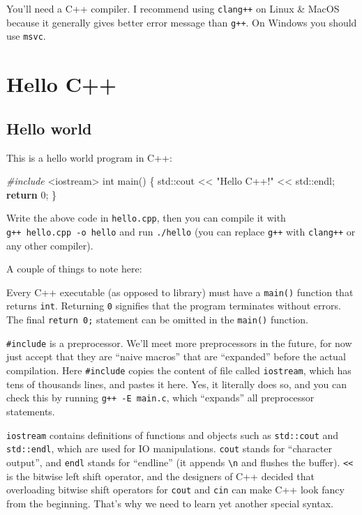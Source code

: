 \documentclass[
]{book}
\newenvironment{Shaded}{\begin{snugshade}}{\end{snugshade}}
\newcommand{\BuiltInTok}[1]{#1}
\newcommand{\ControlFlowTok}[1]{\textcolor[rgb]{0.13,0.29,0.53}{\textbf{#1}}}
\newcommand{\DataTypeTok}[1]{\textcolor[rgb]{0.13,0.29,0.53}{#1}}
\newcommand{\DecValTok}[1]{\textcolor[rgb]{0.00,0.00,0.81}{#1}}
\newcommand{\ImportTok}[1]{#1}
\newcommand{\NormalTok}[1]{#1}
\newcommand{\PreprocessorTok}[1]{\textcolor[rgb]{0.56,0.35,0.01}{\textit{#1}}}
\newcommand{\StringTok}[1]{\textcolor[rgb]{0.31,0.60,0.02}{#1}}
\begin{document}
You'll need a C++ compiler. I recommend using \texttt{clang++} on Linux \& MacOS because it generally gives better error message than \texttt{g++}. On Windows you should use \texttt{msvc}.

\hypertarget{hello-c}{%
\chapter{Hello C++}\label{hello-c}}

\hypertarget{hello-world}{%
\section{Hello world}\label{hello-world}}

This is a hello world program in C++:

\begin{Shaded}
\begin{Highlighting}[]
\PreprocessorTok{\#include }\ImportTok{\textless{}iostream\textgreater{}}
\DataTypeTok{int}\NormalTok{ main()}
\NormalTok{\{}
    \BuiltInTok{std::}\NormalTok{cout \textless{}\textless{} }\StringTok{"Hello C++!"}\NormalTok{ \textless{}\textless{} }\BuiltInTok{std::}\NormalTok{endl;}
    \ControlFlowTok{return} \DecValTok{0}\NormalTok{;}
\NormalTok{\}}
\end{Highlighting}
\end{Shaded}

Write the above code in \texttt{hello.cpp}, then you can compile it with \texttt{g++\ hello.cpp\ -o\ hello} and run \texttt{./hello} (you can replace \texttt{g++} with \texttt{clang++} or any other compiler).

A couple of things to note here:

Every C++ executable (as opposed to library) must have a \texttt{main()} function that returns \texttt{int}. Returning \texttt{0} signifies that the program terminates without errors. The final \texttt{return\ 0;} statement can be omitted in the \texttt{main()} function.

\texttt{\#include} is a preprocessor. We'll meet more preprocessors in the future, for now just accept that they are ``naive macros'' that are ``expanded'' before the actual compilation.
Here \texttt{\#include} copies the content of file called \texttt{iostream}, which has tens of thousands lines, and pastes it here. Yes, it literally does so, and you can check this by running \texttt{g++\ -E\ main.c}, which ``expands'' all preprocessor statements.

\texttt{iostream} contains definitions of functions and objects such as \texttt{std::cout} and \texttt{std::endl}, which are used for IO manipulations. \texttt{cout} stands for ``character output'', and \texttt{endl} stands for ``endline'' (it appends \texttt{\textbackslash{}n} and flushes the buffer). \texttt{\textless{}\textless{}} is the bitwise left shift operator, and the designers of C++ decided that overloading bitwise shift operators for \texttt{cout} and \texttt{cin} can make C++ look fancy from the beginning. That's why we need to learn yet another special syntax.
\end{document}
